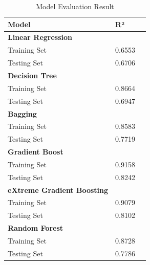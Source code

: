 \documentclass[conference]{IEEEtran}
\begin{document}
    \begin{table}[h]
        \centering
        \renewcommand{\arraystretch}{1.1}
        \begin{tabular}{
            | p{}
            | p{} 
            | p{} |
            }
            \hline
            \textbf{Model} & \textbf{R²} \\
            \hline
            \multicolumn{1}{|l}{\textbf{Linear Regression}} \\
            \hline
            Training Set   & 0.6553 \\
            \hline
            Testing Set & 0.6706 \\
            \hline
            \multicolumn{1}{|l}{\textbf{Decision Tree}}\\
            \hline
            Training Set & 0.8664 \\
            \hline
            Testing Set & 0.6947 \\
            \hline
            \multicolumn{1}{|l}{\textbf{Bagging}} \\
            \hline
            Training Set & 0.8583 \\
            \hline
            Testing Set & 0.7719 \\
            \hline
            \multicolumn{1}{|l}{\textbf{Gradient Boost}}\\
            \hline
            Training Set & 0.9158 \\
            \hline
            Testing Set & 0.8242 \\
            \hline
            \multicolumn{1}{|l}{\textbf{eXtreme Gradient Boosting}}\\
            \hline
            Training Set & 0.9079 \\
            \hline
            Testing Set & 0.8102 \\
            \hline
            \multicolumn{1}{|l}{\textbf{Random Forest}}\\
            \hline
            Training Set & 0.8728 \\
            \hline
            Testing Set & 0.7786 \\
            \hline
        \end{tabular}
    \caption{Model Evaluation Result}
    \end{table}
    
\end{document}
